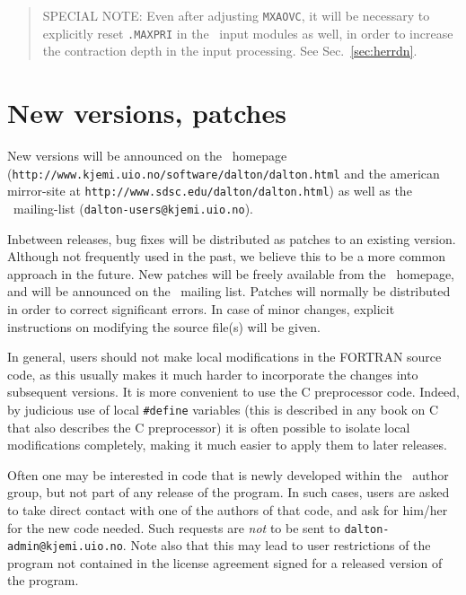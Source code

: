 \begin{quote}
SPECIAL NOTE: Even after adjusting \verb|MXAOVC|, it will be
necessary to explicitly reset \verb|.MAXPRI| in the
\her\ input modules as well, in order to increase the contraction depth
in the input processing.  See Sec.~\ref{sec:herrdn}.
\end{quote}

\section{New versions, patches}

New versions will be announced on the \siraba\
homepage (\verb|http://www.kjemi.uio.no/software/dalton/dalton.html| and the american mirror-site at \verb|http://www.sdsc.edu/dalton/dalton.html|) as well
as the \siraba\ mailing-list
(\verb|dalton-users@kjemi.uio.no|).

Inbetween releases, bug fixes will be distributed as
patches to an
existing version. Although not frequently used in the past, we believe
this to be a more common approach in the future. New patches will be
freely available from the 
\siraba\ homepage, and will be announced on the \siraba\ mailing
list. Patches will normally be distributed in order to correct
significant errors. In case of minor changes, explicit
instructions on modifying the source file(s) will be given.

In general, users should not make local
modifications in the FORTRAN source code, as this usually makes it
much harder to incorporate the changes into subsequent versions.
It is more convenient to use the C preprocessor code.  Indeed, by
judicious use of local \verb|#define|\index{define} variables (this
is described in any book on C that also describes the C
preprocessor) it is often possible to isolate local
modifications completely, making it much easier
to apply them to later
releases.

Often one may be interested in code that is newly developed\index{new
code} within the
\siraba\ author group, but not part of any release of the program. In
such cases, users are asked to take direct contact with one of the
authors of that code, and ask for him/her for the new code
needed. Such requests are {\em not} to be sent to
\verb|dalton-admin@kjemi.uio.no|. Note also that this may lead to user
restrictions of the program not contained in the license agreement
signed for a released version of the program.

